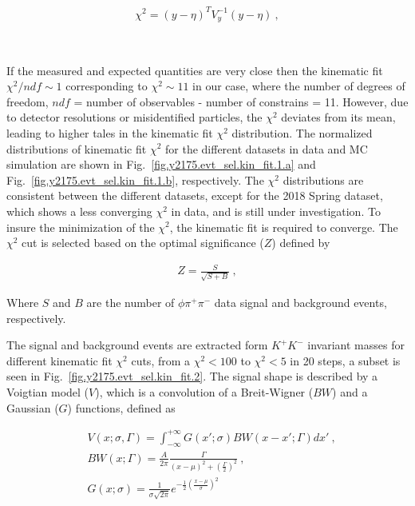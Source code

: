 \begin{equation}
    \label{eq.y2175.evt_sel.kin_fit.1}
    \begin{aligned}
        \chi^{2} = (y-\eta)^{T}V_{y}^{-1}(y-\eta)~,
    \end{aligned}
\end{equation}

~\par If the measured and expected quantities are very close then the kinematic fit $\chi^{2}/ndf \sim 1$ corresponding to $\chi^{2} \sim 11$ in our case, where the number of degrees of freedom, $ndf$ = number of observables - number of constrains = 11. However, due to detector resolutions or misidentified particles, the $\chi^{2}$ deviates from its mean, leading to higher tales in the kinematic fit $\chi^{2}$ distribution. The normalized distributions of kinematic fit $\chi^{2}$ for the different datasets in data and MC simulation are shown in Fig.~\ref{fig.y2175.evt_sel.kin_fit.1.a} and Fig.~\ref{fig.y2175.evt_sel.kin_fit.1.b}, respectively. The $\chi^{2}$ distributions are consistent between the different datasets, except for the 2018 Spring dataset, which shows a less converging $\chi^{2}$ in data, and is still under investigation. To insure the minimization of the $\chi^{2}$, the kinematic fit is required to converge. The $\chi^{2}$ cut is selected based on the optimal significance ($Z$) defined by

\begin{equation}
    \label{eq.y2175.evt_sel.kin_fit.2}
    \begin{aligned}
        Z = \frac{S}{\sqrt{S+B}}~,
    \end{aligned}
\end{equation}

Where $S$ and $B$ are the number of $\phi \pi^{+}\pi^{-}$ data signal and background events, respectively.
~\par The signal and background events are extracted form $K^+K^-$ invariant masses for different kinematic fit $\chi^2$ cuts, from a $\chi^2<100$ to $\chi^2<5$ in 20 steps, a subset is seen in Fig.~\ref{fig.y2175.evt_sel.kin_fit.2}. The signal shape is described by a Voigtian model ($V$), which is a convolution of a Breit-Wigner ($BW$) and a Gaussian ($G$) functions, defined as

\begin{equation}
\label{eq.y2175.evt_sel.kin_fit.3}
    \begin{aligned}
        & V(x;\sigma,\Gamma) = \int_{-\infty}^{+\infty} G(x';\sigma) BW(x-x';\Gamma)dx'~,\\
        & BW(x;\Gamma) =  \frac{A}{2\pi}\frac{\Gamma}{(x-\mu)^2+(\frac{\Gamma}{2})^2}~,\\
        & G(x;\sigma) = \frac{1}{\sigma \sqrt{2\pi}}e^{-\frac{1}{2}(\frac{x-\mu}{\sigma})^2}
    \end{aligned}
\end{equation}

